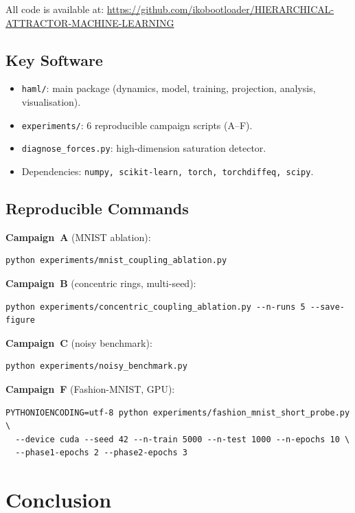 \documentclass[11pt,a4paper]{article}
\begin{document}
All code is available at:
\url{https://github.com/ikobootloader/HIERARCHICAL-ATTRACTOR-MACHINE-LEARNING}

\subsection{Key Software}

\begin{itemize}
  \item \texttt{haml/}: main package (dynamics, model, training, projection, analysis,
        visualisation).
  \item \texttt{experiments/}: 6 reproducible campaign scripts (A--F).
  \item \texttt{diagnose\_forces.py}: high-dimension saturation detector.
  \item Dependencies: \texttt{numpy, scikit-learn, torch, torchdiffeq, scipy}.
\end{itemize}

\subsection{Reproducible Commands}

\textbf{Campaign~A} (MNIST ablation):
\begin{verbatim}
python experiments/mnist_coupling_ablation.py
\end{verbatim}

\textbf{Campaign~B} (concentric rings, multi-seed):
\begin{verbatim}
python experiments/concentric_coupling_ablation.py --n-runs 5 --save-figure
\end{verbatim}

\textbf{Campaign~C} (noisy benchmark):
\begin{verbatim}
python experiments/noisy_benchmark.py
\end{verbatim}

\textbf{Campaign~F} (Fashion-MNIST, GPU):
\begin{verbatim}
PYTHONIOENCODING=utf-8 python experiments/fashion_mnist_short_probe.py \
  --device cuda --seed 42 --n-train 5000 --n-test 1000 --n-epochs 10 \
  --phase1-epochs 2 --phase2-epochs 3
\end{verbatim}

\section{Conclusion}
\end{document}

